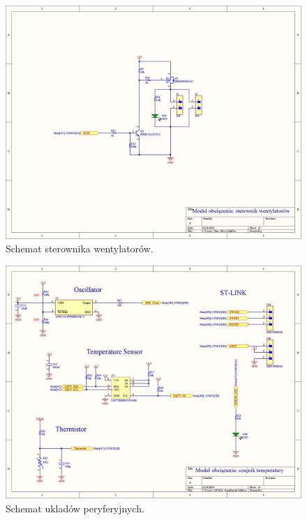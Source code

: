 \begin{figure}
    \begin{center}
        \includegraphics[width = 21cm]{zalaczniki/obciazenie/Obciążenie_aktywne_Strona_04.jpg}
        \caption{Schemat sterownika wentylatorów.}
    \end{center}
\end{figure}

\begin{figure}
    \begin{center}
        \includegraphics[width = 21cm]{zalaczniki/obciazenie/Obciążenie_aktywne_Strona_05.jpg}
        \caption{Schemat ukladów peryferyjnych.}
    \end{center}
\end{figure}

